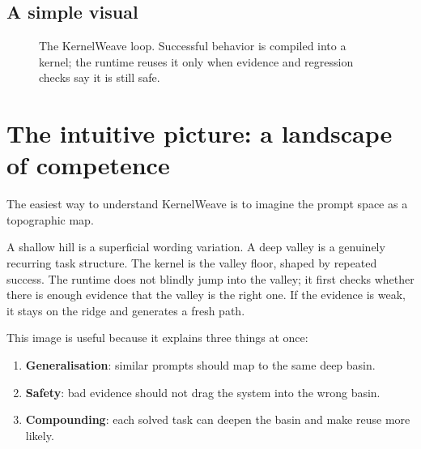 \documentclass{article}
\begin{document}
\subsection{A simple visual}
\begin{figure}[t]
\centering
{}
\caption{The KernelWeave loop. Successful behavior is compiled into a kernel; the runtime reuses it only when evidence and regression checks say it is still safe.}
\end{figure}

\section{The intuitive picture: a landscape of competence}

The easiest way to understand KernelWeave is to imagine the prompt space as a topographic map.

A shallow hill is a superficial wording variation. A deep valley is a genuinely recurring task structure. The kernel is the valley floor, shaped by repeated success. The runtime does not blindly jump into the valley; it first checks whether there is enough evidence that the valley is the right one. If the evidence is weak, it stays on the ridge and generates a fresh path.

This image is useful because it explains three things at once:
\begin{enumerate}[leftmargin=1.2em]
\item \textbf{Generalisation}: similar prompts should map to the same deep basin.
\item \textbf{Safety}: bad evidence should not drag the system into the wrong basin.
\item \textbf{Compounding}: each solved task can deepen the basin and make reuse more likely.
\end{enumerate}
\end{document}

